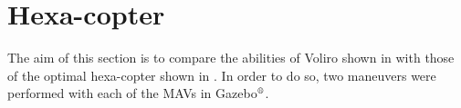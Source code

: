 \clearpage

\section{Hexa-copter}
\label{sec:hexa_copter_sim}

The aim of this section is to compare the abilities of Voliro shown in
 with those of the optimal hexa-copter shown in .
In order to do so, two maneuvers were performed with each of the MAVs in
Gazebo$^\textrm{\textregistered}$.

\begin{figure}[!ht]
\end{figure}
